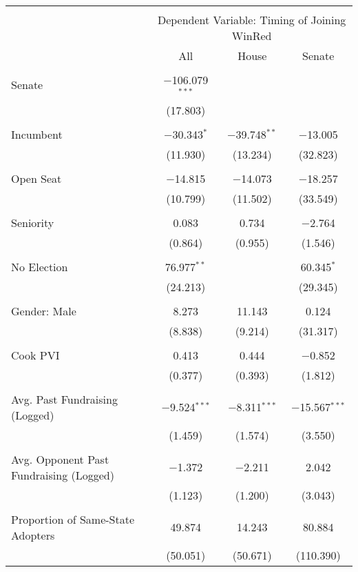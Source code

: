 
\begin{tabular}{@{\extracolsep{5pt}}lccc} 
\\[-1.8ex]\hline 
\hline \\[-1.8ex] 
 & \multicolumn{3}{c}{Dependent Variable: Timing of Joining WinRed} \\ 
\cline{2-4} 
 & All & House & Senate \\ 
\hline \\[-1.8ex] 
 Senate & $-$106.079$^{***}$ &  &  \\ 
  & (17.803) &  &  \\ 
  & & & \\ 
 Incumbent & $-$30.343$^{*}$ & $-$39.748$^{**}$ & $-$13.005 \\ 
  & (11.930) & (13.234) & (32.823) \\ 
  & & & \\ 
 Open Seat & $-$14.815 & $-$14.073 & $-$18.257 \\ 
  & (10.799) & (11.502) & (33.549) \\ 
  & & & \\ 
 Seniority & 0.083 & 0.734 & $-$2.764 \\ 
  & (0.864) & (0.955) & (1.546) \\ 
  & & & \\ 
 No Election & 76.977$^{**}$ &  & 60.345$^{*}$ \\ 
  & (24.213) &  & (29.345) \\ 
  & & & \\ 
 Gender: Male & 8.273 & 11.143 & 0.124 \\ 
  & (8.838) & (9.214) & (31.317) \\ 
  & & & \\ 
 Cook PVI & 0.413 & 0.444 & $-$0.852 \\ 
  & (0.377) & (0.393) & (1.812) \\ 
  & & & \\ 
 Avg. Past Fundraising (Logged) & $-$9.524$^{***}$ & $-$8.311$^{***}$ & $-$15.567$^{***}$ \\ 
  & (1.459) & (1.574) & (3.550) \\ 
  & & & \\ 
 Avg. Opponent Past Fundraising (Logged) & $-$1.372 & $-$2.211 & 2.042 \\ 
  & (1.123) & (1.200) & (3.043) \\ 
  & & & \\ 
 Proportion of Same-State Adopters & 49.874 & 14.243 & 80.884 \\ 
  & (50.051) & (50.671) & (110.390) \\ 

\end{tabular}
